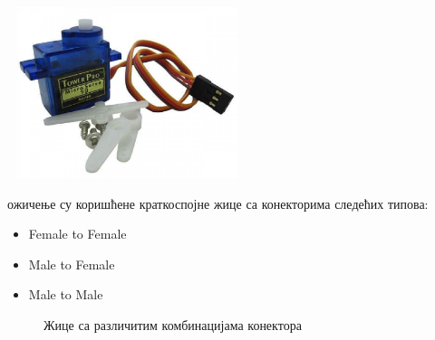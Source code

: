 \documentclass[12pt]{article}
\begin{document}
\begin{center}
    \centering 
    \includegraphics[height=5cm, width=7cm]{images/servo}
\end{center}
\vspace{0.5cm}
\indent{} ожичење су коришћене краткоспојне жице са конекторима следећих типова:
\begin{itemize}
  \item Female to Female
  \item Male to Female
  \item Male to Male
\end{itemize}
\begin{figure}[H]
\centering
{}
\hfill %
\hfill %
\caption{Жице са различитим комбинацијама конектора}
\end{figure}
\end{document}
